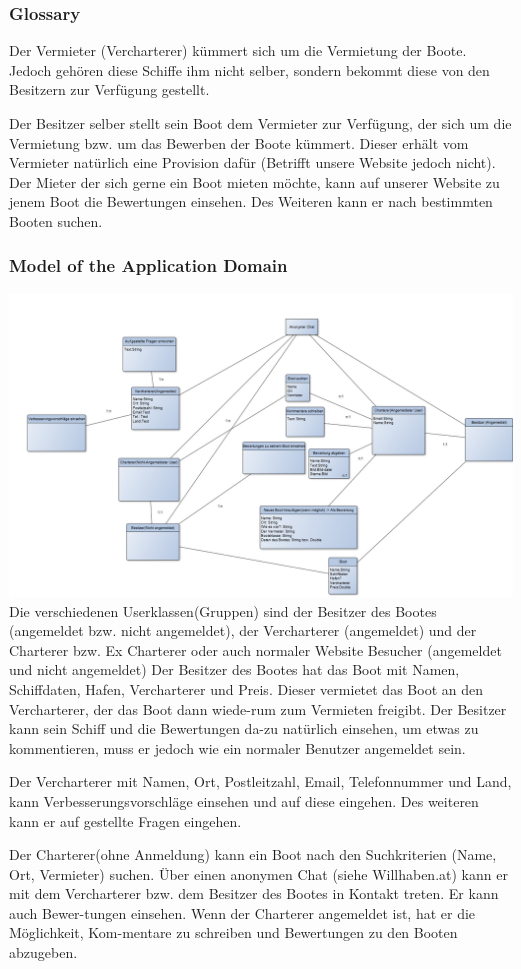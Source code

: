 \documentclass[12pt]{article}
\theoremstyle{definition}
\newenvironment{explanation}{%
   \setlength{\parindent}{0pt}
   \itshape
   \color{blue}
}{}
\begin{document}
\subsubsection{Glossary}
\begin{explanation}
	Der Vermieter (Vercharterer) kümmert sich um die Vermietung der Boote. Jedoch gehören diese Schiffe ihm nicht selber, sondern bekommt diese von den Besitzern zur Verfügung gestellt.

	Der Besitzer selber stellt sein Boot dem Vermieter zur Verfügung, der sich um die Vermietung bzw. um das Bewerben der Boote kümmert. Dieser erhält vom Vermieter natürlich eine Provision dafür (Betrifft unsere Website jedoch nicht).
	Der Mieter der sich gerne ein Boot mieten möchte, kann auf unserer Website zu jenem Boot die Bewertungen einsehen. Des Weiteren kann er nach bestimmten Booten suchen.
\end{explanation}

\subsubsection{Model of the Application Domain}
\begin{explanation}
	\includegraphics[height=0.50\textwidth]{SysUML.PNG}
	Die verschiedenen Userklassen(Gruppen) sind der Besitzer des Bootes (angemeldet bzw. nicht angemeldet), der Vercharterer (angemeldet) und der Charterer bzw. Ex Charterer oder auch normaler Website Besucher (angemeldet und nicht angemeldet)
	Der Besitzer des Bootes hat das Boot mit Namen, Schiffdaten, Hafen, Vercharterer und Preis. Dieser vermietet das Boot an den Vercharterer, der das Boot dann wiede-rum zum Vermieten freigibt.  Der Besitzer kann sein Schiff und die Bewertungen da-zu natürlich einsehen, um etwas zu kommentieren, muss er jedoch wie ein normaler Benutzer angemeldet sein.

	Der Vercharterer mit Namen, Ort, Postleitzahl, Email, Telefonnummer und Land, kann Verbesserungsvorschläge einsehen und auf diese eingehen. Des weiteren kann er auf gestellte Fragen eingehen.

	Der Charterer(ohne Anmeldung) kann ein Boot nach den Suchkriterien (Name, Ort, Vermieter) suchen. Über einen anonymen Chat (siehe Willhaben.at) kann er mit dem Vercharterer bzw. dem Besitzer des Bootes in Kontakt treten. Er kann auch Bewer-tungen einsehen. Wenn der Charterer angemeldet ist, hat er die Möglichkeit, Kom-mentare zu schreiben und Bewertungen zu den Booten abzugeben. 

\end{explanation}
\end{document}
